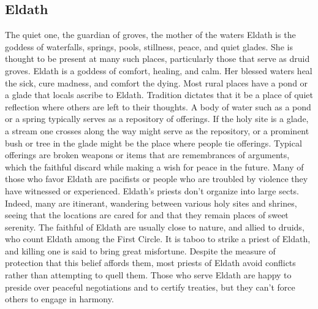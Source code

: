 \documentclass[10pt,a4paper,twoside,twocolumn,openany,bg=print,nodeprecatedcode]{dndbook}
\begin{document}
\subsection{Eldath}
The quiet one, the guardian of groves, the mother of the waters
Eldath is the goddess of waterfalls, springs, pools, stillness, peace, and quiet glades. She is thought to be present at many such places, particularly those that serve as druid groves. Eldath is a goddess of comfort, healing, and calm. Her blessed waters heal the sick, cure madness, and comfort the dying.
Most rural places have a pond or a glade that locals ascribe to Eldath. Tradition dictates that it be a place of quiet reflection where others are left to their thoughts. A body of water such as a pond or a spring typically serves as a repository of offerings. If the holy site is a glade, a stream one crosses along the way might serve as the repository, or a prominent bush or tree in the glade might be the place where people tie offerings. Typical offerings are broken weapons or items that are remembrances of arguments, which the faithful discard while making a wish for peace in the future. Many of those who favor Eldath are pacifists or people who are troubled by violence they have witnessed or experienced.
Eldath's priests don't organize into large sects. Indeed, many are itinerant, wandering between various holy sites and shrines, seeing that the locations are cared for and that they remain places of sweet serenity. The faithful of Eldath are usually close to nature, and allied to druids, who count Eldath among the First Circle. It is taboo to strike a priest of Eldath, and killing one is said to bring great misfortune. Despite the measure of protection that this belief affords them, most priests of Eldath avoid conflicts rather than attempting to quell them. Those who serve Eldath are happy to preside over peaceful negotiations and to certify treaties, but they can't force others to engage in harmony.
\end{document}
